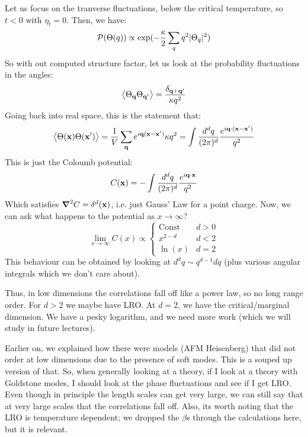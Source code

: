 Let us focus on the tranverse fluctuations, below the critical temperature, so $t < 0$ with $\eta_t = 0$. Then, we have:
\begin{equation}
    \mathcal{P}(\Theta(q)) \propto \exp(-\frac{\kappa}{2}\sum_q q^2\lvert \Theta_q \rvert^2)
\end{equation}
So with out computed structure factor, let us look at the probability fluctuations in the angles:
\begin{equation}
    \left< \Theta_{\mathbf{q}}\Theta_{\mathbf{q}'} \right> = \frac{\delta_{\mathbf{q} + \mathbf{q}'}}{\kappa q^2}
\end{equation}
Going back into real space, this is the statement that:
\begin{equation}
    \left< \Theta(\mathbf{x})\Theta(\mathbf{x}') \right> = \frac{1}{V}\sum_{\mathbf{q}}e^{i\mathbf{q}(\mathbf{x} - \mathbf{x}')}{\kappa q^2} = \int \frac{d^dq}{(2\pi)^d}\frac{e^{i\mathbf{q}\cdot(\mathbf{x} - \mathbf{x}')}}{q^2}
\end{equation}
This is just the Coloumb potential:
\begin{equation}
    C(\mathbf{x}) = -\int \frac{d^d q}{(2\pi)^d}\frac{e^{i\mathbf{q}\cdot\mathbf{x}}}{q^2}
\end{equation}
Which satisfies $\nabla^2 C = \delta^d(\v{x})$, i.e. just Gauss' Law for a point charge. Now, we can ask what happens to the potential as $x \to \infty$?
\begin{equation}
    \lim_{x \to \infty}C(x) \propto \begin{cases}
        \text{Const} & d > 0
        \\ x^{2-d} & d < 2
        \\ \ln(x) & d =2 
    \end{cases}
\end{equation}
This behaviour can be obtained by looking at $d^dq \sim q^{d-1}dq$ (plus various angular integrals which we don't care about). 

Thus, in low dimensions the correlations fall off like a power law, so no long range order. For $d > 2$ we maybe have LRO. At $d = 2$, we have the critical/marginal dimension. We have a pesky logarithm, and we need more work (which we will study in future lectures).

Earlier on, we explained how there were models (AFM Heisenberg) that did not order at low dimensions due to the presence of soft modes. This is a souped up version of that. So, when generally looking at a theory, if I look at a theory with Goldstone modes, I should look at the phase fluctuations and see if I get LRO. Even though in principle the length scales can get very large, we can still say that at very large scales that the correlations fall off. Also, its worth noting that the LRO is temperature dependent; we dropped the $\beta$s through the calculations here, but it is relevant.